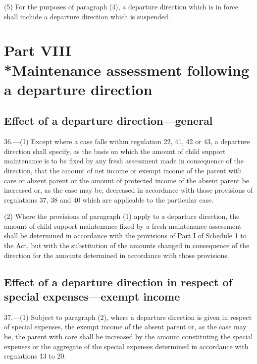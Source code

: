 \documentclass[a4paper]{article}
\newcommand{\parthead}{}
\begin{document}
(5) For the purposes of paragraph (4), a departure direction which is in force
shall include a departure direction which is suspended.

\section[Part VIII --- Maintenance assessment following a departure direction]{Part VIII\\*Maintenance assessment following a departure direction}

\renewcommand\parthead{--- Part VIII}

\subsection[36. Effect of a
departure direction—general]{Effect of a
departure direction—general}

36.—(1) Except where a case falls within regulation
22, 41, 42 or 43, a departure direction shall specify, as the basis on which the
amount of child support maintenance is to be fixed by any fresh assessment made
in consequence of the direction, that the amount of net income or exempt income
of the parent with care or absent parent or the amount of protected income of
the absent parent be increased or, as the case may be, decreased in accordance
with those provisions of regulations 37, 38 and 40 which are applicable to the
particular case.

(2) Where the provisions of paragraph (1) apply to a departure direction, the
amount of child support maintenance fixed by a fresh maintenance assessment
shall be determined in accordance with the provisions of Part I of Schedule 1 to
the Act, but with the substitution of the amounts changed in consequence of the
direction for the amounts determined in accordance with those provisions.

\subsection[37. Effect of a departure direction in respect of special expenses—\hspace{0pt}exempt
income]{Effect of a departure direction in respect of special expenses—\hspace{0pt}exempt
income}

37.—(1) Subject to paragraph (2), where a departure direction is given in
respect of special expenses, the exempt income of the absent parent or, as the
case may be, the parent with care shall be increased by the amount constituting
the special expenses or the aggregate of the special expenses determined in
accordance with regulations 13 to 20.
\end{document}
